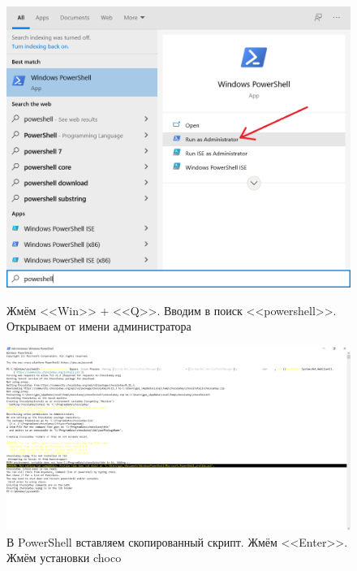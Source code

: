 \begin{figure}[!p]
    \centering
    \begin{minipage}{0.47\textwidth}
        \centering
        \includegraphics[width=\linewidth]
            {_assets/gpi_pz_choco_3.png}
        \caption{Жмём <<Win>> + <<Q>>. Вводим в поиск <<powershell>>. Открываем от имени администратора}
        \label{fig:gpi_pz_choco_3}
    \end{minipage}
    \begin{minipage}{0.47\textwidth}
        \centering
        \includegraphics[width=\linewidth]
            {_assets/gpi_pz_choco_4.png}
        \caption{В PowerShell вставляем скопированный скрипт. Жмём <<Enter>>. Жмём установки choco}
        \label{fig:gpi_pz_choco_4}
    \end{minipage}
\end{figure}

